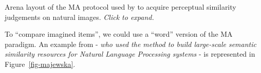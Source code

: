 \documentclass[
  authoryear]{elsarticle}
\begin{document}
\begin{marginfigure}


\caption{\label{fig-spam-mur}Arena layout of the MA protocol used by
\citet{murHumanObjectSimilarityJudgments2013} to acquire perceptual
similarity judgements on natural images. \emph{Click to expand.}}

\end{marginfigure}%

To ``compare imagined items'', we could use a ``word'' version of the MA
paradigm. An example from
\citet{majewskaSpatialMultiarrangementClustering2020} - \emph{who used
the method to build large-scale semantic similarity resources for
Natural Language Processing systems} - is represented in
Figure~\ref{fig-majewska}.
\end{document}
